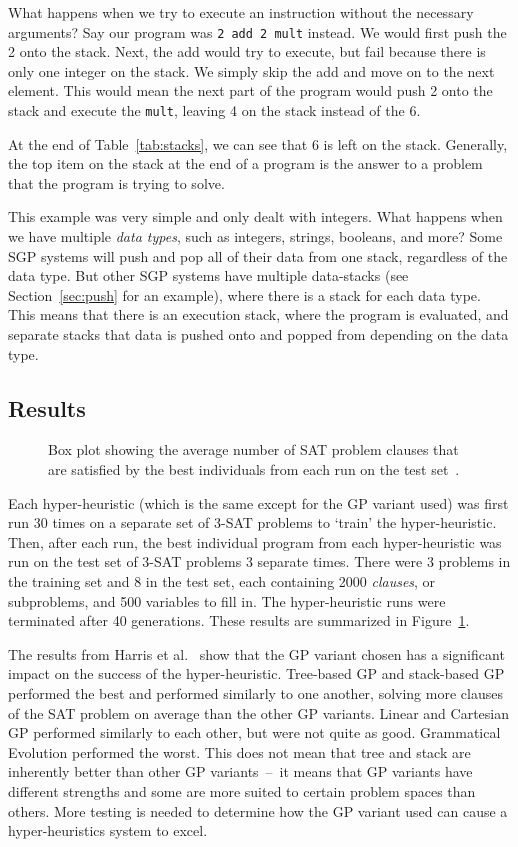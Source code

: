 \documentclass{sig-alternate}
\begin{document}
What happens when we try to execute an instruction without the necessary arguments? Say our program was \texttt{2~add~2~mult} instead. We would first push the 2 onto the stack. Next, the add would try to execute, but fail because there is only one integer on the stack. We simply skip the add and move on to the next element. This would mean the next part of the program would push 2 onto the stack and execute the \texttt{mult}, leaving 4 on the stack instead of the 6.

At the end of Table~\ref{tab:stacks}, we can see that 6 is left on the stack. Generally, the top item on the stack at the end of a program is the answer to a problem that the program is trying to solve.

This example was very simple and only dealt with integers. What happens when we have multiple \textit{data types}, such as integers, strings, booleans, and more? Some SGP systems will push and pop all of their data from one stack, regardless of the data type. But other SGP systems have multiple data-stacks (see Section~\ref{sec:push} for an example), where there is a stack for each data type. This means that there is an execution stack, where the program is evaluated, and separate stacks that data is pushed onto and popped from depending on the data type.

\subsection{Results}
\label{sec:gpresults}
\begin{figure}
	\centering
	\caption{Box plot showing the average number of SAT problem clauses that are satisfied by the best individuals from each run on the test set~\cite{harris:2015}.}
	\label{fig:gpvariants}
\end{figure}
Each hyper-heuristic (which is the same except for the GP variant used) was first run 30 times on a separate set of 3-SAT problems to `train' the hyper-heuristic. Then, after each run, the best individual program from each hyper-heuristic was run on the test set of 3-SAT problems 3 separate times. There were 3 problems in the training set and 8 in the test set, each containing 2000 \textit{clauses}, or subproblems, and 500 variables to fill in. The hyper-heuristic runs were terminated after 40 generations. These results are summarized in Figure~\ref{fig:gpvariants}.

The results from Harris et al.~\cite{harris:2015} show that the GP variant chosen has a significant impact on the success of the hyper-heuristic. Tree-based GP and stack-based GP performed the best and performed similarly to one another, solving more clauses of the SAT problem on average than the other GP variants. Linear and Cartesian GP performed similarly to each other, but were not quite as good. Grammatical Evolution performed the worst. This does not mean that tree and stack are inherently better than other GP variants~--~it means that GP variants have different strengths and some are more suited to certain problem spaces than others. More testing is needed to determine how the GP variant used can cause a hyper-heuristics system to excel.
\end{document}
